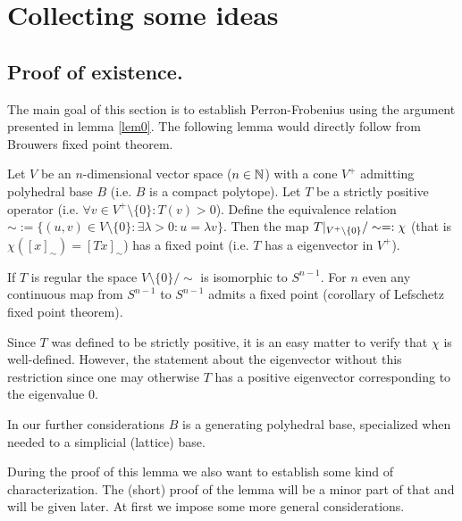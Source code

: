 \documentclass{article}
\begin{document}
\section{Collecting some ideas}

\subsection{Proof of existence.}

The main goal of this section is to establish Perron-Frobenius using the argument presented in lemma \ref{lem0}.
The following lemma would directly follow from Brouwers fixed point theorem.

\begin{lemma}\label{lem1}
Let $V$ be an $n$-dimensional vector space ($n\in\mathbb{N}$) with a cone $V^+$ admitting polyhedral base $B$ (i.e. $B$ is a compact polytope). Let $T$ be a strictly positive operator (i.e. $\forall v\in V^+\setminus\{0\}:T(v)>0$). Define the equivalence relation $\sim:=\{(u,v)\in V\setminus\{0\}:\exists \lambda>0:u=\lambda v\}$.  Then the map $T\vert_{V^+\setminus\{0\}}/\sim=:\chi$ (that is $\chi([x]_{\sim})=[Tx]_{\sim}$) has a fixed point (i.e. $T$ has a eigenvector in $V^+$).  
\end{lemma}

\begin{remark}\label{rem5}
If $T$ is regular the space $V\setminus\{0\}/\sim$ is isomorphic to $S^{n-1}$. For $n$ even any continuous map from $S^{n-1}$ to $S^{n-1}$ admits a fixed point (corollary of Lefschetz fixed point theorem). 
\end{remark}

\begin{remark}
Since $T$ was defined to be strictly positive, it is an easy matter to verify that $\chi$ is well-defined. However, the statement about the eigenvector without this restriction since one may otherwise $T$ has a positive eigenvector corresponding to the eigenvalue $0$.
\end{remark}

\begin{remark}\label{rem6}
In our further considerations $B$ is a generating polyhedral base, specialized when needed to a simplicial (lattice) base.
\end{remark}

During the proof of this lemma we also want to establish some kind of characterization.
The (short) proof of the lemma will be a minor part of that and will be given later. At first we impose some more general considerations.
\end{document}
